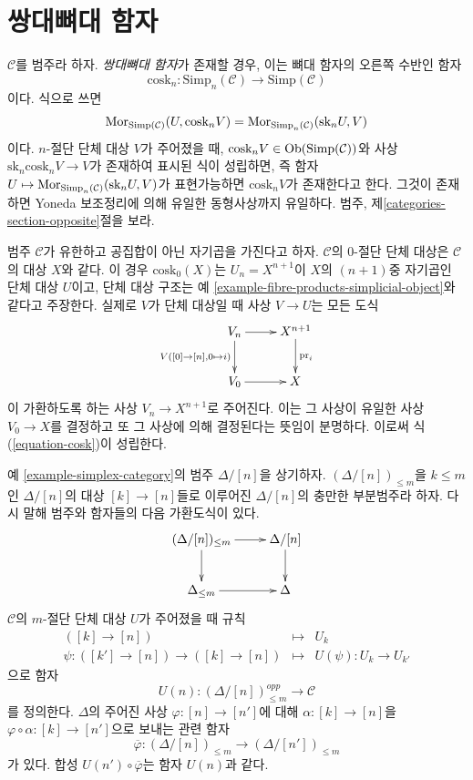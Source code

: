 \section{쌍대뼈대 함자}
\label{section-coskeleton}

\noindent
$\mathcal{C}$를 범주라 하자.
{\it 쌍대뼈대 함자}가 존재할 경우, 이는 뼈대 함자의 오른쪽 수반인 함자
$$
\text{cosk}_n :
\text{Simp}_n(\mathcal{C}) \longrightarrow \text{Simp}(\mathcal{C})
$$
이다. 식으로 쓰면
\begin{equation}
\label{equation-cosk}
\mathop{\mathrm{Mor}}\nolimits_{\text{Simp}(\mathcal{C})}(U, \text{cosk}_n V)
=
\mathop{\mathrm{Mor}}\nolimits_{\text{Simp}_n(\mathcal{C})}(\text{sk}_n U, V)
\end{equation}
이다. $n$-절단 단체 대상 $V$가 주어졌을 때,
$\text{cosk}_nV \in \mathop{\mathrm{Ob}}\nolimits(\text{Simp}(\mathcal{C}))$와 사상
$\text{sk}_n \text{cosk}_n V \to V$가 존재하여 표시된 식이 성립하면,
즉 함자 $U \mapsto \mathop{\mathrm{Mor}}\nolimits_{\text{Simp}_n(\mathcal{C})}(\text{sk}_n U, V)$가
표현가능하면 {{$\text{cosk}_nV$가 존재한다}}고 한다.
그것이 존재하면 Yoneda 보조정리에 의해 유일한 동형사상까지 유일하다.
범주, 제\ref{categories-section-opposite}절을 보라.

\begin{example}
\label{example-cosk0}
범주 $\mathcal{C}$가 유한하고 공집합이 아닌 자기곱을 가진다고 하자.
$\mathcal{C}$의 $0$-절단 단체 대상은 $\mathcal{C}$의 대상 $X$와 같다.
이 경우 $\text{cosk}_0(X)$는 $U_n = X^{n + 1}$이 $X$의
$(n + 1)$중 자기곱인 단체 대상 $U$이고, 단체 대상 구조는 예
\ref{example-fibre-products-simplicial-object}와 같다고 주장한다.
실제로 $V$가 단체 대상일 때 사상 $V \to U$는 모든 도식
$$
\xymatrix{
V_n \ar[r] \ar[d]_{V([0] \to [n], 0 \mapsto i)} &
X^{n + 1} \ar[d]^{\text{pr}_i} \\
V_0 \ar[r] &
X
}
$$
이 가환하도록 하는 사상 $V_n \to X^{n + 1}$로 주어진다.
이는 그 사상이 유일한 사상 $V_0 \to X$를 결정하고 또 그 사상에 의해
결정된다는 뜻임이 분명하다. 이로써 식 (\ref{equation-cosk})이 성립한다.
\end{example}

\noindent
예 \ref{example-simplex-category}의 범주 $\Delta/[n]$을 상기하자.
$(\Delta/[n])_{\leq m}$을 $k \leq m$인 $\Delta/[n]$의 대상
$[k] \to [n]$들로 이루어진 $\Delta/[n]$의 충만한 부분범주라 하자.
다시 말해 범주와 함자들의 다음 가환도식이 있다.
$$
\xymatrix{
(\Delta/[n])_{\leq m} \ar[r] \ar[d] &
\Delta/[n] \ar[d] \\
\Delta_{\leq m} \ar[r] &
\Delta
}
$$
$\mathcal{C}$의 $m$-절단 단체 대상 $U$가 주어졌을 때 규칙
\begin{eqnarray*}
([k] \to [n]) & \longmapsto & U_k \\
\psi : ([k'] \to [n]) \to ([k] \to [n]) &
\longmapsto &
U(\psi) : U_k \to U_{k'}
\end{eqnarray*}
으로 함자
$$
U(n) : (\Delta/[n])_{\leq m}^{opp} \longrightarrow \mathcal{C}
$$
를 정의한다. $\Delta$의 주어진 사상 $\varphi : [n] \to [n']$에 대해
$\alpha : [k] \to [n]$을 $\varphi \circ \alpha : [k] \to [n']$으로
보내는 관련 함자
$$
\overline{\varphi} :
(\Delta/[n])_{\leq m}
\longrightarrow
(\Delta/[n'])_{\leq m}
$$
가 있다. 합성 $U(n') \circ \overline{\varphi}$는 함자 $U(n)$과 같다.

